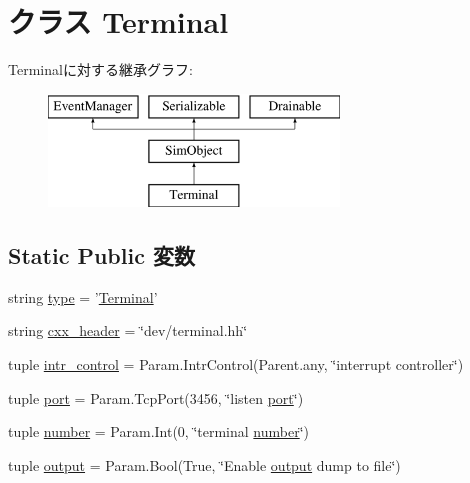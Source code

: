 \hypertarget{classTerminal_1_1Terminal}{
\section{クラス Terminal}
\label{classTerminal_1_1Terminal}
}
Terminalに対する継承グラフ:\begin{figure}[H]
\begin{center}
\leavevmode
\includegraphics[height=3cm]{classTerminal_1_1Terminal}
\end{center}
\end{figure}
\subsection*{Static Public 変数}
\begin{DoxyCompactItemize}
\item 
string \hyperlink{classTerminal_1_1Terminal_acce15679d830831b0bbe8ebc2a60b2ca}{type} = '\hyperlink{classTerminal_1_1Terminal}{Terminal}'
\item 
string \hyperlink{classTerminal_1_1Terminal_a17da7064bc5c518791f0c891eff05fda}{cxx\_\-header} = \char`\"{}dev/terminal.hh\char`\"{}
\item 
tuple \hyperlink{classTerminal_1_1Terminal_aeaf8661c040c8b846389e91469b79801}{intr\_\-control} = Param.IntrControl(Parent.any, \char`\"{}interrupt controller\char`\"{})
\item 
tuple \hyperlink{classTerminal_1_1Terminal_a1aadf525515ecfcf662c2aa51a503763}{port} = Param.TcpPort(3456, \char`\"{}listen \hyperlink{classTerminal_1_1Terminal_a1aadf525515ecfcf662c2aa51a503763}{port}\char`\"{})
\item 
tuple \hyperlink{classTerminal_1_1Terminal_a629b7ca94b6a486bdc504ed959b90cc8}{number} = Param.Int(0, \char`\"{}terminal \hyperlink{classTerminal_1_1Terminal_a629b7ca94b6a486bdc504ed959b90cc8}{number}\char`\"{})
\item 
tuple \hyperlink{classTerminal_1_1Terminal_acf316e258896197f4e917a6547e49532}{output} = Param.Bool(True, \char`\"{}Enable \hyperlink{classTerminal_1_1Terminal_acf316e258896197f4e917a6547e49532}{output} dump to file\char`\"{})
\end{DoxyCompactItemize}


